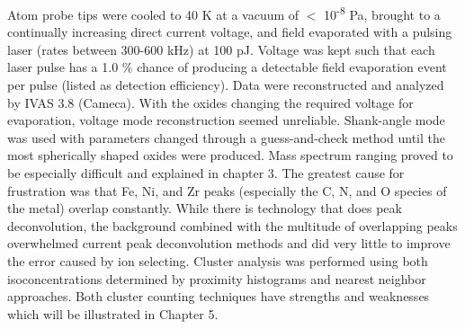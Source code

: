 		
		
		Atom probe tips were cooled to 40 K at a vacuum of $<$ 10\textsuperscript{-8} Pa, brought to a continually increasing direct current voltage, and field evaporated with a pulsing laser (rates between 300-600 kHz) at 100 pJ. Voltage was kept such that each laser pulse has a 1.0 $\%$  chance of producing a detectable field evaporation event per pulse (listed as detection efficiency). Data were reconstructed and analyzed by IVAS 3.8 (Cameca). With the oxides changing the required voltage for evaporation, voltage mode reconstruction seemed unreliable. Shank-angle mode was used with parameters changed through a guess-and-check method until the most spherically shaped oxides were produced. Mass spectrum ranging proved to be especially difficult and explained in chapter 3. The greatest cause for frustration was that Fe, Ni, and Zr peaks (especially the C, N, and O species of the metal) overlap constantly. While there is technology that does peak deconvolution, the background combined with the multitude of overlapping peaks overwhelmed current peak deconvolution methods and did very little to improve the error caused by ion selecting. Cluster analysis was performed using both isoconcentrations determined by proximity histograms and nearest neighbor approaches. Both cluster counting techniques have strengths and weaknesses which will be illustrated in Chapter 5.
